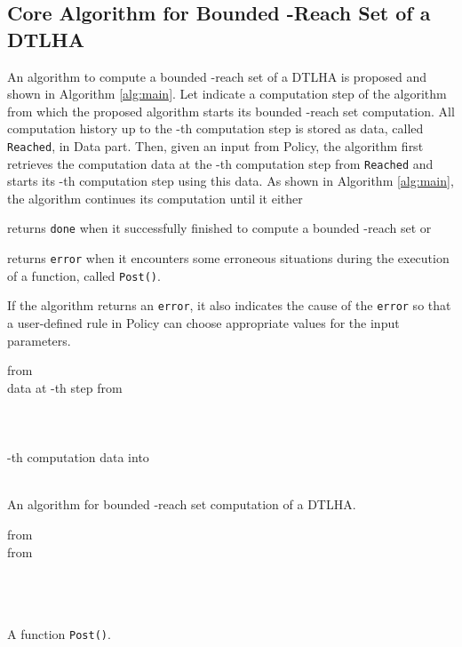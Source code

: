 \subsection{Core Algorithm for Bounded -Reach Set of a DTLHA}  \label{sec:design:algo}





An algorithm to compute a bounded -reach set of a DTLHA is proposed and shown in Algorithm \ref{alg:main}.
Let  indicate a computation step of the algorithm from which the proposed algorithm starts its bounded -reach set computation.
All computation history up to the -th computation step is stored as data, called {\tt Reached}, in Data part.
Then, given an input  from Policy, the algorithm first retrieves the computation data at the -th computation step from {\tt Reached} and starts its -th computation step using this data.
As shown in Algorithm \ref{alg:main}, the algorithm continues its computation until it either
\begin{inparaenum}[(i)]
	\item returns {\tt done} when it successfully finished to compute a bounded -reach set or
	\item returns {\tt error} when it encounters some erroneous situations during the execution of a function, called {\tt Post()}.
\end{inparaenum}
If the algorithm returns an {\tt error}, it also indicates the cause of the {\tt error} so that a user-defined rule in Policy can choose appropriate values for the input parameters.


\begin{algorithm}  \SetAlgoLined 
\BlankLine
{} 
\BlankLine
\Compute  from \\
\BlankLine
\While{\True} {
\Get data at -th step from \Reached \\
\If{} {
	\Compute \\ \Update  }
\\
\Call  \Post  \\
\Store -th computation data into \Reached \\
\\
\lIf{}{\Return \Done}
}
\BlankLine
\caption{An algorithm for bounded -reach set computation of a DTLHA.}
\label{alg:main}
\end{algorithm}


\begin{algorithm} \SetAlgoLined 
\BlankLine
\KwIn{} 
\BlankLine
\Compute  from \\
\Compute  from \\
\Update  \\
\BlankLine
\lIf{}{\Return \Err}\\
\lIf{} {\Return \Err} \\
\uElseIf{}{\Return \Err}
\lElse{}
\BlankLine
\caption{A function {\tt Post()}.}
\label{alg:post}
\end{algorithm}



